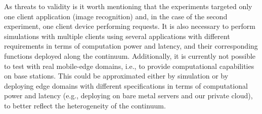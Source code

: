 


As threats to validity is it worth mentioning that the experiments targeted only one client application (image recognition) and, in the case of the second experiment, one client device performing requests. It is also necessary to perform simulations with multiple clients using several applications with different requirements in terms of computation power and latency, and their corresponding functions deployed along the continuum. Additionally, it is currently not possible to test with real mobile-edge domains, i.e., to provide computational capabilities on base stations. This could be approximated either by simulation or by deploying edge domains with different specifications in terms of computational power and latency (e.g., deploying on bare metal servers and our private cloud), to better reflect the heterogeneity of the continuum. %



